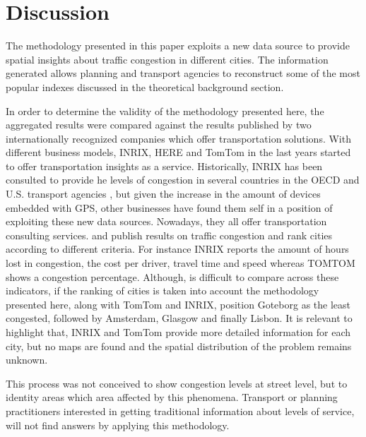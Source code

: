 \documentclass[a4paper]{jpconf}
\begin{document}
	
	\section{Discussion} %
	The methodology presented in this paper exploits a new data source to provide spatial insights about traffic congestion in different cities. The information generated allows planning and transport agencies to reconstruct some of the most popular indexes discussed in the theoretical background section.\par
	
	In order to determine the validity of the methodology presented here, the aggregated results were compared against the results published by two internationally recognized companies which offer transportation solutions. With different business models, INRIX, HERE and TomTom in the last years started to offer transportation insights as a service. Historically, INRIX has been consulted to provide he levels of congestion in several countries in the OECD and U.S. transport agencies \parencite{Eurostat2016, TheTexasA&MTransportationInstitute2019}, but given the increase in the amount of devices embedded with GPS, other businesses have found them self in a position of exploiting these new data sources. Nowadays, they all offer transportation consulting services. \textcite{Inrix2018} and \textcite{TomTom2018} publish results on traffic congestion and rank cities according to different criteria. For instance INRIX reports the amount of hours lost in congestion, the cost per driver, travel time and speed whereas TOMTOM shows a congestion percentage. Although, is difficult to compare across these indicators, if the ranking of cities is taken into account the methodology presented here, along with TomTom and INRIX, position Goteborg as the least congested, followed by Amsterdam, Glasgow and finally Lisbon. It is relevant to highlight that, INRIX and TomTom provide more detailed information for each city, but no maps are found and the spatial distribution of the problem remains unknown. \par
	
	This process was not conceived to show congestion levels at street level, but to identity areas which area affected by this phenomena. Transport or planning practitioners interested in getting traditional information about levels of service, will not find answers by applying this methodology. \par 
	
\end{document}
